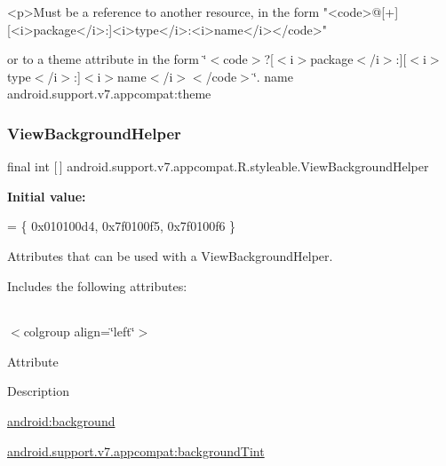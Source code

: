 \begin{DoxyVerb}      <p>Must be a reference to another resource, in the form "<code>@[+][<i>package</i>:]<i>type</i>:<i>name</i></code>"
\end{DoxyVerb}
 or to a theme attribute in the form \char`\"{}$<$code$>$?\mbox{[}$<$i$>$package$<$/i$>$\+:\mbox{]}\mbox{[}$<$i$>$type$<$/i$>$\+:\mbox{]}$<$i$>$name$<$/i$>$$<$/code$>$\char`\"{}.  name android.\+support.\+v7.\+appcompat\+:theme \mbox{\label{classandroid_1_1support_1_1v7_1_1appcompat_1_1R_1_1styleable_a41b23c720259f27b563271bda1b5767a}} 
\subsubsection{\texorpdfstring{View\+Background\+Helper}{ViewBackgroundHelper}}
{\footnotesize\ttfamily final int \mbox{[}$\,$\mbox{]} android.\+support.\+v7.\+appcompat.\+R.\+styleable.\+View\+Background\+Helper\hspace{0.3cm}{\ttfamily [static]}}

{\bfseries Initial value\+:}
\begin{DoxyCode}
= \{
            0x010100d4, 0x7f0100f5, 0x7f0100f6
        \}
\end{DoxyCode}
Attributes that can be used with a View\+Background\+Helper. 

Includes the following attributes\+:

\tabulinesep=1mm
\begin{longtabu} spread 0pt [c]{*{0}{|X[-1]}|}
\hline
\end{longtabu}
$<$colgroup align=\char`\"{}left\char`\"{}$>$ 

Attribute

Description 

{\ttfamily \hyperlink{classandroid_1_1support_1_1v7_1_1appcompat_1_1R_1_1styleable_a0c4b9c84285d81c51eed6464d0775ffc}{android\+:background}}

{\ttfamily \hyperlink{classandroid_1_1support_1_1v7_1_1appcompat_1_1R_1_1styleable_a3508f617e0fdda797627149c05c527f3}{android.\+support.\+v7.\+appcompat\+:background\+Tint}}

